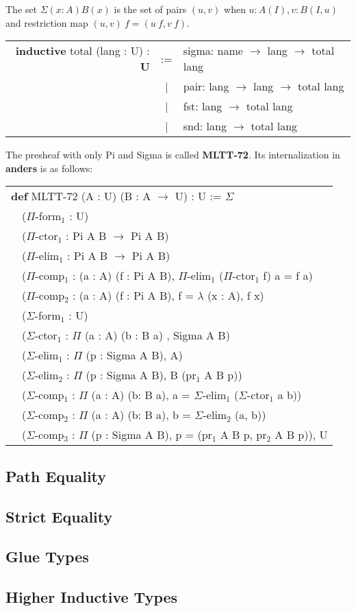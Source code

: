 \documentclass[a4paper,UKenglish,cleveref, autoref, thm-restate]{lipics-v2021}
\newcommand{\tabstyle}[0]{\scriptsize\ttfamily\fontseries{l}\selectfont}
\begin{document}
\begin{definition}[Sigma]
The set $\Sigma(x:A)B(x)$ is the set of pairs $(u,v)$ when $u:A(I),v:B(I,u)$ and restriction map $(u,v)\ f=(u\ f,v\ f)$.
\end{definition}
\begin{table}[ht]
\tabstyle
\begin{tabular}{rcl}
  \textbf{inductive} total (lang : U) : \textbf{U}& := & sigma: name $\rightarrow$ lang $\rightarrow$ total lang \\
  &|& pair: lang $\rightarrow$ lang $\rightarrow$ total lang \\
  &|& fst: lang $\rightarrow$ total lang \\
  &|& snd: lang $\rightarrow$ total lang \\
\end{tabular}
\end{table}

The presheaf with only Pi and Sigma is called \textbf{MLTT-72}. Its internalization in \textbf{anders} is as follows:

\begin{table}[ht!]
\tabstyle
\begin{tabular}{l}
\textbf{def} MLTT-72 (A : U) (B : A $\rightarrow$ U) : U := $\Sigma$ \\
\ \ ($\Pi$-form$_1$ : U) \\
\ \ ($\Pi$-ctor$_1$ : Pi A B $\rightarrow$ Pi A B) \\
\ \ ($\Pi$-elim$_1$ : Pi A B $\rightarrow$ Pi A B) \\
\ \ ($\Pi$-comp$_1$ : (a : A) (f : Pi A B), $\Pi$-elim$_1$ ($\Pi$-ctor$_1$ f) a = f a) \\
\ \ ($\Pi$-comp$_2$ : (a : A) (f : Pi A B), f = $\lambda$ (x : A), f x) \\
\ \ ($\Sigma$-form$_1$ : U) \\
\ \ ($\Sigma$-ctor$_1$ : $\Pi$ (a : A) (b : B a) , Sigma A B) \\
\ \ ($\Sigma$-elim$_1$ : $\Pi$ (p : Sigma A B), A) \\
\ \ ($\Sigma$-elim$_2$ : $\Pi$ (p : Sigma A B), B (pr$_1$ A B p)) \\
\ \ ($\Sigma$-comp$_1$ : $\Pi$ (a : A) (b: B a), a = $\Sigma$-elim$_1$ ($\Sigma$-ctor$_1$ a b)) \\
\ \ ($\Sigma$-comp$_2$ : $\Pi$ (a : A) (b: B a), b = $\Sigma$-elim$_2$ (a, b)) \\
\ \ ($\Sigma$-comp$_3$ : $\Pi$ (p : Sigma A B), p = (pr$_1$ A B p, pr$_2$ A B p)), U
\end{tabular}
\end{table}

\newpage
\subsection{Path Equality}

\subsection{Strict Equality}

\subsection{Glue Types}

\subsection{Higher Inductive Types}


\end{document}

